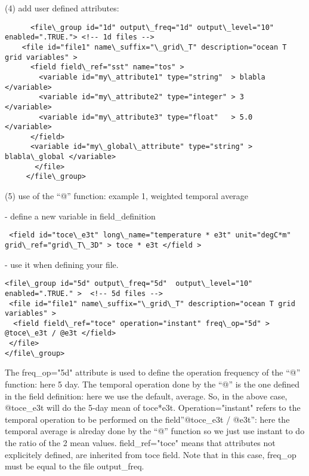 \documentclass[NEMO_book]{subfiles}
\begin{document}
(4) add user defined attributes:

\vspace{-20pt}
\begin{alltt}  {{\scriptsize    
\begin{verbatim}
      <file\_group id="1d" output\_freq="1d" output\_level="10" enabled=".TRUE."> <!-- 1d files --> 
	<file id="file1" name\_suffix="\_grid\_T" description="ocean T grid variables" >
	  <field field\_ref="sst" name="tos" >
	    <variable id="my\_attribute1" type="string"  > blabla </variable>
	    <variable id="my\_attribute2" type="integer" > 3      </variable>
	    <variable id="my\_attribute3" type="float"   > 5.0    </variable>
	  </field>
	  <variable id="my\_global\_attribute" type="string" > blabla\_global </variable>
       </file>
     </file\_group> 
\end{verbatim}
}}\end{alltt} 

(5) use of the ``@'' function: example 1, weighted temporal average

 - define a new variable in field\_definition
\vspace{-20pt}
\begin{alltt}  {{\scriptsize    
\begin{verbatim}
 <field id="toce\_e3t" long\_name="temperature * e3t" unit="degC*m" grid\_ref="grid\_T\_3D" > toce * e3t </field >
\end{verbatim}
}}\end{alltt}
 - use it when defining your file.  
\vspace{-20pt}
\begin{alltt}  {{\scriptsize    
\begin{verbatim}
<file\_group id="5d" output\_freq="5d"  output\_level="10" enabled=".TRUE." >  <!-- 5d files -->  
 <file id="file1" name\_suffix="\_grid\_T" description="ocean T grid variables" >
  <field field\_ref="toce" operation="instant" freq\_op="5d" > @toce\_e3t / @e3t </field>
 </file>
</file\_group> 
\end{verbatim}
}}\end{alltt}
The freq\_op="5d" attribute is used to define the operation frequency of the ``@'' function: here 5 day. The temporal operation done by the ``@'' is the one defined in the field definition: here we use the default, average. So, in the above case, @toce\_e3t will do the 5-day mean of toce*e3t. Operation="instant" refers to the temporal operation to be performed on the field''@toce\_e3t / @e3t'': here the temporal average is alreday done by the ``@'' function so we just use instant to do the ratio of the 2 mean values. field\_ref="toce" means that attributes not explicitely defined, are inherited from toce field. Note that in this case, freq\_op must be equal to the file output\_freq.
\end{document}
